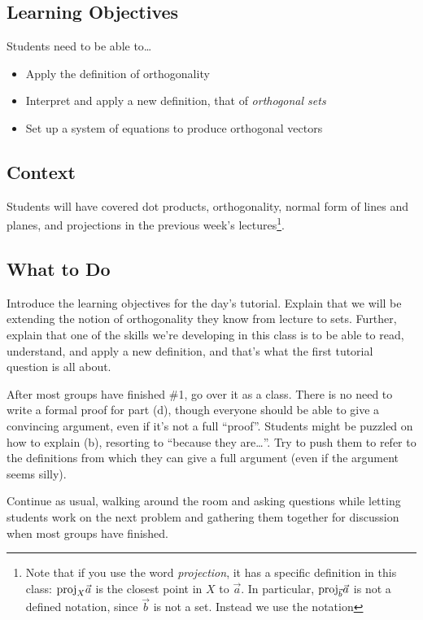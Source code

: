\subsection*{Learning Objectives}
	Students need to be able to\ldots
	\begin{itemize}
		\item Apply the definition of orthogonality
		\item Interpret and apply a new definition, that of \emph{orthogonal sets}
		\item Set up a system of equations to produce orthogonal vectors
	\end{itemize}

\subsection*{Context}
	Students will have covered dot products, orthogonality, normal form of lines and planes, and
		projections in the previous week's lectures\footnote{ Note that if you use the word \emph{projection},
		it has a specific definition in this class: $\mathrm{proj}_{X}\vec a$ is the closest point in $X$
		to $\vec a$. In particular, $\mathrm{proj}_{\vec b}\vec a$ is not a defined notation, since $\vec b$ is
		not a set. Instead we use the notation}.

\subsection*{What to Do}
	Introduce the learning objectives for the day's tutorial. Explain that we will be extending
		the notion of orthogonality they know from lecture to sets. Further, explain that one of the skills
		we're developing in this class is to be able to read, understand, and apply a new definition, and that's
		what the first tutorial question is all about.

	
	After most groups have finished \#1, go over it as a class. There is no need to write a formal
		proof for part (d), though everyone should be able to give a convincing argument, even
		if it's not a full ``proof''. Students might be puzzled on how to explain (b),
		resorting to ``because they are\ldots''. Try to push them to refer to the definitions
		from which they can give a full argument (even if the argument seems silly).

	Continue as usual, walking around the room and asking
		questions while letting students work on the next problem and gathering them together
		for discussion when most groups have finished.

